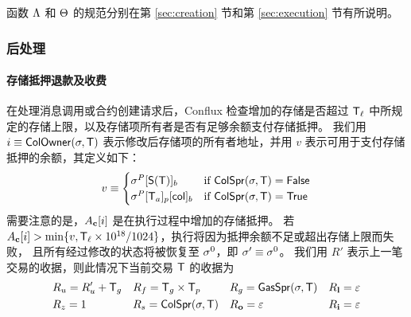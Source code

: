 函数 $\mathrm{\Lambda}$ 和 $\mathrm{\Theta}$ 的规范分别在第 \ref{sec:creation} 节和第 \ref{sec:execution} 节有所说明。

\subsubsection{后处理}\label{sec:tx_post_process}

\paragraph{存储抵押退款及收费}

在处理消息调用或合约创建请求后，Conflux 检查增加的存储是否超过 $\textsf{T}_\ell$ 中所规定的存储上限，以及存储项所有者是否有足够余额支付存储抵押。
我们用 $i\equiv \mathsf{ColOwner}(\mathbf{\sigma},\textsf{T})$ 表示修改后存储项的所有者地址，并用 $v$ 表示可用于支付存储抵押的余额，其定义如下：
\begin{align}
	v \equiv \begin{cases}
		\mathbf{\sigma}^{P}[\mathsf{S}{\left({\textsf{T}} \right)}]_b & \text{if }\mathsf{ColSpr}(\mathbf{\sigma},\textsf{T})=\mathsf{False} \\
		\mathbf{\sigma}^{P}[\textsf{T}_a]_p[{\sf col}]_b &  \text{if }\mathsf{ColSpr}(\mathbf{\sigma},\textsf{T})=\mathsf{True}
	\end{cases}
\end{align}
%
需要注意的是，$A_{\bf c}[i]$ 是在执行过程中增加的存储抵押。
若 $A_{\bf c}[i]>\min\{v,\textsf{T}_\ell\times 10^{18}/1024\}$，执行将因为抵押余额不足或超出存储上限而失败，
且所有经过修改的状态将被恢复至 $\mathbf{\sigma}^0$，即 $\mathbf{\sigma}'\equiv\mathbf{\sigma}^0$。
我们用 $R'$ 表示上一笔交易的收据，则此情况下当前交易 $\textsf{T}$ 的收据为
\begin{align}
	&R_u=R'_u+\textsf{T}_g && R_f = \textsf{T}_g\times\textsf{T}_p && R_g = \mathsf{GasSpr}(\mathbf{\sigma},\textsf{T}) && R_{\bf l}=\mathbb{\varepsilon} \\
	&R_z=1 && R_s = \mathsf{ColSpr}(\mathbf{\sigma},\textsf{T}) && R_{\bf o}=\mathbb{\varepsilon} && R_{\bf i}=\mathbb{\varepsilon}
\end{align}

